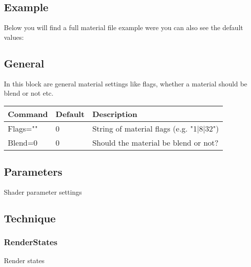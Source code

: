 \subsection{Example}
Below you will find a full material file example were you can also see the default values:\\





\subsection{General}
In this block are general material settings like flags, whether a material should be blend
or not etc.\\

\begin{tabular}{|p{2.5cm}|p{2.5cm}|p{9cm}|}
\hline
\textbf{Command} & \textbf{Default} & \textbf{Description}\\
\hline
Flags="" & 0 & String of material flags (e.g. "1|8|32")\\
\hline
Blend=0  & 0 & Should the material be blend or not?\\
\hline
\end{tabular}




\subsection{Parameters}
Shader parameter settings




\subsection{Technique}



\subsubsection{RenderStates}
Render states\\

